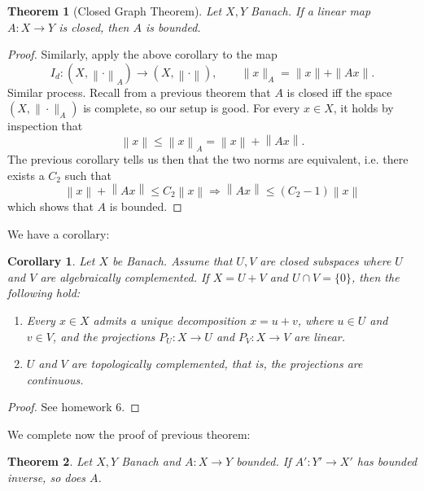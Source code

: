 \documentclass[letterpaper,twoside,11pt]{article}
\theoremstyle{mystyle}
\newtheorem*{thm}{Theorem}		%
\newtheorem{corollary}{Corollary}[theorem]
\newcommand{\cg}{\color{gray}}
\newcommand{\cbk}{\color{black}}
\begin{document}
\begin{tcolorbox}[colback=red!5!white,colframe=red!75!black]
  \begin{thm}[Closed Graph Theorem]
    Let $X,Y$ Banach. If a linear map $A:X\to Y$ is closed, then $A$ is bounded. 
  \end{thm}
\end{tcolorbox}
\begin{proof}
  Similarly, apply the above corollary to the map \[{I_d}:\left( {X,\left\|  \cdot  \right\|_A} \right) \to \left( {X,{{\left\|  \cdot  \right\|}}} \right),\qquad \|x\|_A = \|x\| + \|Ax\|.\]
  \cg Similar process. Recall from a previous theorem that $A$ is closed iff the space $(X, \|\cdot\|_A)$ is complete, so our setup is good. For every $x\in X$, it holds by inspection that 
  \[\left\| x \right\| \leq {\left\| x \right\|_A} = \left\| x \right\| + \left\| {Ax} \right\|.\]
  The previous corollary tells us then that the two norms are equivalent, i.e. there exists a $C_2$ such that 
  \[\left\| x \right\| + \left\| {Ax} \right\| \leq {C_2}\left\| x \right\| \Rightarrow \left\| {Ax} \right\| \leq \left( {{C_2} - 1} \right)\left\| x \right\|\]
  which shows that $A$ is bounded. \cbk
\end{proof}
We have a corollary:
\begin{tcolorbox}[colframe=red!75!black]
  \begin{corollary}
    Let $X$ be Banach. Assume that $U,V$ are closed subspaces where $U$ and $V$ are algebraically complemented. If $X = U+V$ and $U\cap V = \{0\}$, then the following hold: 
    
    \begin{enumerate}[label=(\alph*)]
      \item Every $x\in X$ admits a unique decomposition $x = u + v$, where $u\in U$ and $v\in V$, and the projections $P_U: X \to U$ and $P_V : X\to V$ are linear. 
      \item $U$ and $V$ are topologically complemented, that is, the projections are continuous. 
    \end{enumerate}

  \end{corollary}
\end{tcolorbox}
\begin{proof}
  See homework 6. 
\end{proof}
We complete now the proof of previous theorem: 
\begin{tcolorbox}[colback=red!5!white,colframe=red!75!black]
  \begin{thm}
    Let $X,Y$ Banach and $A:X\to Y$ bounded. If $A' : Y' \to X'$ has bounded inverse, so does $A$. 
  \end{thm}
\end{tcolorbox}
\end{document}
